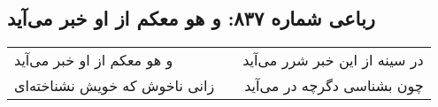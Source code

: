 \begin{center}
\section*{رباعی شماره ۸۳۷: و هو معکم از او خبر می‌آید}
\label{sec:0837}
\begin{longtable}{l p{0.5cm} r}
و هو معکم از او خبر می‌آید
&&
در سینه از این خبر شرر می‌آید
\\
زانی ناخوش که خویش نشناخته‌ای
&&
چون بشناسی دگرچه در می‌آید
\\
\end{longtable}
\end{center}
